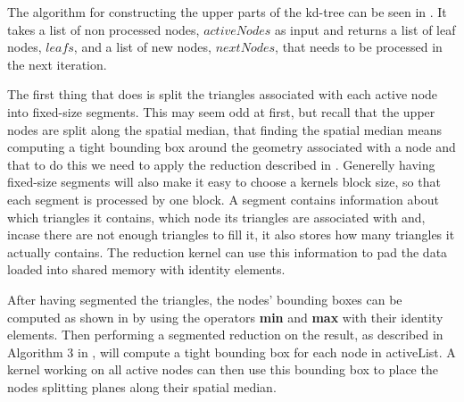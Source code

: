 \begin{algorithm}
\begin{algorithmic}
{                 \STATE{}


                   \ELSE
                   \ENDIF
                 \ENDFOR
  }
  \end{algorithmic}
\end{algorithm}


The algorithm for constructing the upper parts of the kd-tree can be
seen in . It takes a list of non
processed nodes, $activeNodes$ as input and returns a list of leaf
nodes, $leafs$, and a list of new nodes, $nextNodes$, that needs to be
processed in the next iteration.



The first thing that  does is split the triangles
associated with each active node into fixed-size segments. This may seem odd at
first, but recall that the upper nodes are split along the spatial median, that
finding the spatial median means computing a tight bounding box around the
geometry associated with a node and that to do this we need to apply the
reduction described in . Generelly having fixed-size
segments will also make it easy to choose a kernels block size, so that each
segment is processed by one block. A segment contains information about which
triangles it contains, which node its triangles are associated with and, incase
there are not enough triangles to fill it, it also stores how many triangles it
actually contains. The reduction kernel can use this information to pad the data
loaded into shared memory with identity elements.

After having segmented the triangles, the nodes' bounding boxes can be computed
as shown in  by using the operators \textbf{min} and
\textbf{max} with their identity elements. Then performing a segmented reduction
on the result, as described in Algorithm 3 in \zhou, will compute a tight
bounding box for each node in activeList. A kernel working on all active nodes
can then use this bounding box to place the nodes splitting planes along their
spatial median.

